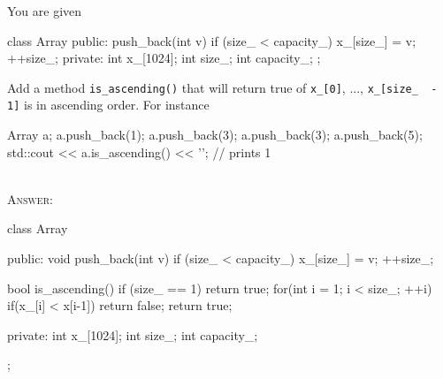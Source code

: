 \nextq
You are given
\begin{console}[fontsize=\footnotesize,frame=single]
class Array
{
public:
    push_back(int v)
    {
        if (size_ < capacity_)
        {
            x_[size_] = v;
            ++size_;
        }
    }
private:
    int x_[1024];
    int size_;
    int capacity_;
};
\end{console}
Add a method \verb!is_ascending()! that will return true
of \verb!x_[0]!, ..., \verb!x_[size_  - 1]! is in ascending order.
For instance
\begin{console}[fontsize=\footnotesize,frame=single]
Array a;
a.push_back(1);
a.push_back(3);
a.push_back(3);
a.push_back(5);
std::cout << a.is_ascending() << '\n'; // prints 1
\end{console}
\\
\textsc{Answer:}\vspace{-2mm}
\begin{answercode}
class Array
{
public:
    void push_back(int v)
    {
        if (size_ < capacity_)
        {
            x_[size_] = v;
            ++size_;
        }
    }

    bool is_ascending()
    {
        if (size_ == 1)
           return true;
        for(int i = 1; i < size_; ++i)
        {
                if(x_[i] < x[i-1])
                         return false;
        }
        return true;
    }

private:
    int x_[1024];
    int size_;
    int capacity_;
};
\end{answercode}


\newpage


